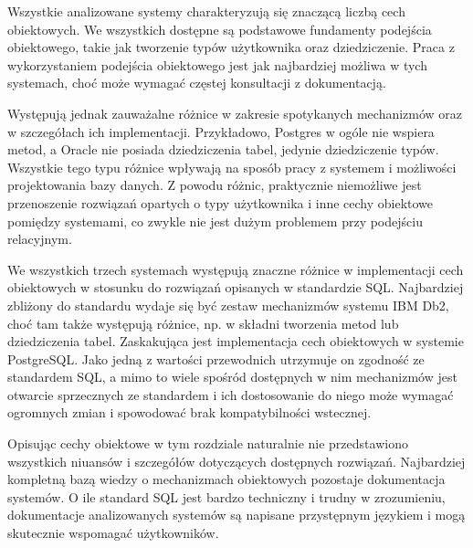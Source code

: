 \documentclass[a4paper,twoside,12pt]{book}
\begin{document}
Wszystkie analizowane systemy charakteryzują się znaczącą liczbą cech obiektowych. We wszystkich dostępne są podstawowe fundamenty podejścia obiektowego, takie jak tworzenie typów użytkownika oraz dziedziczenie. Praca z wykorzystaniem podejścia obiektowego jest jak najbardziej możliwa w tych systemach, choć może wymagać częstej konsultacji z dokumentacją.

Występują jednak zauważalne różnice w zakresie spotykanych mechanizmów oraz w szczegółach ich implementacji. Przykładowo, Postgres w ogóle nie wspiera metod, a Oracle nie posiada dziedziczenia tabel, jedynie dziedziczenie typów. Wszystkie tego typu różnice wpływają na sposób pracy z systemem i możliwości projektowania bazy danych. Z powodu różnic, praktycznie niemożliwe jest przenoszenie rozwiązań opartych o typy użytkownika i inne cechy obiektowe pomiędzy systemami, co zwykle nie jest dużym problemem przy podejściu relacyjnym.

We wszystkich trzech systemach występują znaczne różnice w implementacji cech obiektowych w stosunku do rozwiązań opisanych w standardzie SQL. Najbardziej zbliżony do standardu wydaje się być zestaw mechanizmów systemu IBM Db2, choć tam także występują różnice, np. w składni tworzenia metod lub dziedziczenia tabel. Zaskakująca jest implementacja cech obiektowych w systemie PostgreSQL. Jako jedną z wartości przewodnich utrzymuje on zgodność ze standardem SQL, a mimo to wiele spośród dostępnych w nim mechanizmów jest otwarcie sprzecznych ze standardem i ich dostosowanie do niego może wymagać ogromnych zmian i spowodować brak kompatybilności wstecznej.

Opisując cechy obiektowe w tym rozdziale naturalnie nie przedstawiono wszystkich niuansów i szczegółów dotyczących dostępnych rozwiązań. Najbardziej kompletną bazą wiedzy o mechanizmach obiektowych pozostaje dokumentacja systemów. O ile standard SQL jest bardzo techniczny i trudny w zrozumieniu, dokumentacje analizowanych systemów są napisane przystępnym językiem i mogą skutecznie wspomagać użytkowników.




\newcommand{\green}{\cellcolor[HTML]{3fd447}}
\newcommand{\red}{\cellcolor[HTML]{cc586b}}

\renewcommand\theadalign{bc}
\renewcommand\cellalign{bc}
\renewcommand\theadfont{\bfseries}
\renewcommand\theadgape{\Gape[4pt]}
\end{document}
